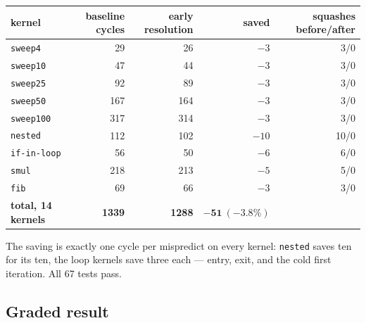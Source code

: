 \documentclass[11pt]{article}
\begin{document}
\begin{center}
\small
\begin{tabular}{lrrrr}
\toprule
kernel & baseline cycles & early resolution & saved & squashes before/after \\
\midrule
\texttt{sweep4}  &  29 &  26 & $-3$ & 3/0 \\
\texttt{sweep10} &  47 &  44 & $-3$ & 3/0 \\
\texttt{sweep25} &  92 &  89 & $-3$ & 3/0 \\
\texttt{sweep50} & 167 & 164 & $-3$ & 3/0 \\
\texttt{sweep100}& 317 & 314 & $-3$ & 3/0 \\
\texttt{nested}  & 112 & 102 & $-10$ & 10/0 \\
\texttt{if-in-loop}& 56 &  50 & $-6$ & 6/0 \\
\texttt{smul}    & 218 & 213 & $-5$ & 5/0 \\
\texttt{fib}     &  69 &  66 & $-3$ & 3/0 \\
\midrule
\textbf{total, 14 kernels} & \textbf{1339} & \textbf{1288} & $\mathbf{-51\ (-3.8\%)}$ & \\
\bottomrule
\end{tabular}
\end{center}

The saving is exactly one cycle per mispredict on every kernel: \texttt{nested} saves ten for
its ten, the loop kernels save three each --- entry, exit, and the cold first iteration. All
67 tests pass.

\subsection{Graded result}
\end{document}
